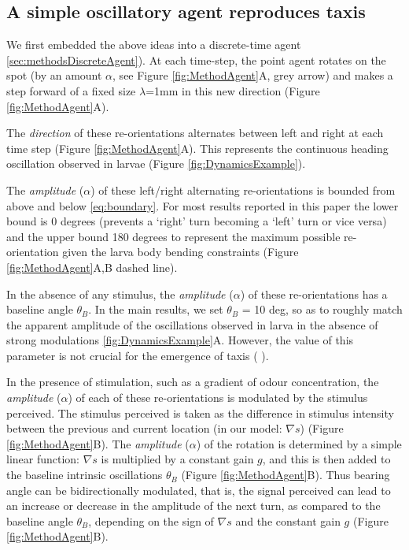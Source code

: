 \documentclass[11pt,a4paper]{article}
\newcommand{\todoBW}[1]{\todo[author=BW,color=orange, size=\tiny,inline]{#1}}
\begin{document}
\subsection{A simple oscillatory agent reproduces taxis}

We first embedded the above ideas into a discrete-time agent \ref{sec:methodsDiscreteAgent}). At each time-step, the point agent rotates on the spot (by an amount $\alpha$, see Figure \ref{fig:MethodAgent}A, grey arrow) and makes a step forward of a fixed size $\lambda$=1mm in this new direction (Figure \ref{fig:MethodAgent}A).

The {\it direction} of these re-orientations alternates between left and right at each time step (Figure \ref{fig:MethodAgent}A). This represents the continuous heading oscillation observed in larvae (Figure \ref{fig:DynamicsExample}).  

The {\it amplitude} ($\alpha$) of these left/right alternating re-orientations is bounded from above and below \eqref{eq:boundary}. For most results reported in this paper the lower bound is 0 degrees (prevents a `right' turn becoming a `left' turn or vice versa) and the upper bound 180 degrees to represent the maximum possible re-orientation given the larva body bending constraints (Figure \ref{fig:MethodAgent}A,B dashed line).

In the absence of any stimulus, the {\it amplitude} ($\alpha$) of these re-orientations has a baseline angle $\theta_{B}$. In the main results, we set $\theta_{B}$ = 10 deg, so as to roughly match the apparent amplitude of the oscillations observed in larva in the absence of strong modulations \ref{fig:DynamicsExample}A. However, the value of this parameter is not crucial for the emergence of taxis ( ).

In the presence of stimulation, such as a gradient of odour concentration, the {\it amplitude} ($\alpha$) of each of these re-orientations is modulated by the stimulus perceived. The stimulus perceived is taken as the difference in stimulus intensity between the previous and current location (in our model: $\nabla s$) (Figure \ref{fig:MethodAgent}B). 
The {\it amplitude} ($\alpha$) of the rotation is determined by a simple linear function: $\nabla s$ is multiplied by a constant gain $g$, and this is then added to the baseline intrinsic oscillations $\theta_{B}$ (Figure \ref{fig:MethodAgent}B). Thus bearing angle can be bidirectionally modulated, that is, the signal perceived can lead to an increase or decrease in the amplitude of the next turn, as compared to the baseline angle $\theta_{B}$, depending on the sign of $\nabla s$  and the constant gain $g$ (Figure \ref{fig:MethodAgent}B).
\end{document}
